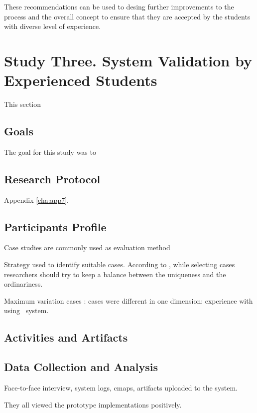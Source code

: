 These recommendations can be used to desing further improvements to the process
and the overall concept to ensure that they are accepted by the students with
diverse level of experience.
 
\section{Study Three. System Validation by Experienced Students}
\label{sec:three}

This section

\subsection{Goals}

The goal for this study was to

\subsection{Research Protocol}

Appendix \ref{cha:app7}.

\subsection{Participants Profile}

Case studies are commonly used as evaluation method \citep{Yin2012}

 Strategy used to identify suitable cases. According to \citet{Stake1995},
 while selecting cases researchers should try to keep a balance between the
 uniqueness and the ordinariness.

Maximum variation cases \citep{Flyvbjerg2006}: cases were different in
one dimension: experience with using \ep~system.

\subsection{Activities and Artifacts}



\subsection{Data Collection and Analysis}

Face-to-face interview, system logs, cmaps, artifacts uploaded to the system.

They all viewed the prototype implementations positively.


